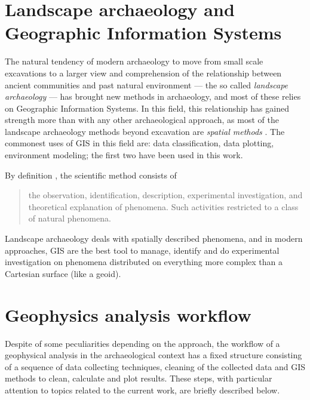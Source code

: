     \section{Landscape archaeology and Geographic Information Systems}
        The natural tendency of modern archaeology to move from small scale excavations to a larger view and comprehension of the relationship between ancient communities and past natural environment --- the so called \emph{landscape archaeology} --- has brought new methods in archaeology, and most of these relies on Geographic Information Systems. In this field, this relationship has gained strength more than with any other archaeological approach, as most of the landscape archaeology methods beyond excavation are \emph{spatial methods} \cite[preface]{space-archaeology}. The commonest uses of GIS in this field are: data classification, data plotting, environment modeling; the first two have been used in this work.

        By definition \cite{american-dict}, the scientific method consists of
        \begin{quote}
            the observation, identification, description, experimental investigation, and theoretical explanation of phenomena. Such activities restricted to a class of natural phenomena.
        \end{quote}
        Landscape archaeology deals with spatially described phenomena, and in modern approaches, GIS are the best tool to manage, identify and do experimental investigation on phenomena distributed on everything more complex than a Cartesian surface (like a geoid).

    \section{Geophysics analysis workflow}
        Despite of some peculiarities depending on the approach, the workflow of a geophysical analysis in the archaeological context has a fixed structure consisting of a sequence of data collecting techniques, cleaning of the collected data and GIS methods to clean, calculate and plot results. These steps, with particular attention to topics related to the current work, are briefly described below.

